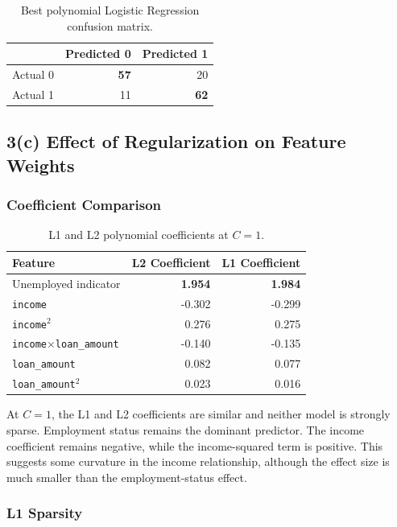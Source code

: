 \documentclass[12pt]{article}
\newcommand{\best}[1]{\textbf{#1}}
\begin{document}
\begin{table}[H]
\centering
\caption{Best polynomial Logistic Regression confusion matrix.}
\begin{tabular}{lrr}
\toprule
 & Predicted 0 & Predicted 1 \\
\midrule
Actual 0 & \best{57} & 20 \\
Actual 1 & 11 & \best{62} \\
\bottomrule
\end{tabular}
\end{table}

\subsection{3(c) Effect of Regularization on Feature Weights}

\subsubsection{Coefficient Comparison}

\begin{table}[H]
\centering
\caption{L1 and L2 polynomial coefficients at $C=1$.}
\begin{tabular}{lrr}
\toprule
Feature & L2 Coefficient & L1 Coefficient \\
\midrule
Unemployed indicator & \best{1.954} & \best{1.984} \\
\texttt{income} & -0.302 & -0.299 \\
\texttt{income}$^2$ & 0.276 & 0.275 \\
\texttt{income}$\times$\texttt{loan\_amount} & -0.140 & -0.135 \\
\texttt{loan\_amount} & 0.082 & 0.077 \\
\texttt{loan\_amount}$^2$ & 0.023 & 0.016 \\
\bottomrule
\end{tabular}
\end{table}

At $C=1$, the L1 and L2 coefficients are similar and neither model is strongly sparse. Employment status remains the dominant predictor. The income coefficient remains negative, while the income-squared term is positive. This suggests some curvature in the income relationship, although the effect size is much smaller than the employment-status effect.

\subsubsection{L1 Sparsity}
\end{document}
